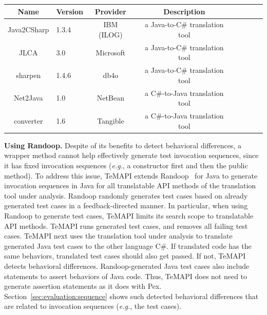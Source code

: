 
\label{sec:approach:sequence}
\begin{table}[t]
\centering
\begin{SmallOut}
\begin {tabular} {|c|l|c|c|c|c|c|c|}
\hline
\textbf{Name}& \textbf{Version}& \textbf{Provider} &\textbf{Description}\\
\hline
Java2CSharp  &  1.3.4 & IBM (ILOG) & a Java-to-C\# translation tool\\
\hline
JLCA         &  3.0   & Microsoft  & a Java-to-C\# translation tool\\
\hline
sharpen      &  1.4.6 & db4o       & a Java-to-C\# translation tool \\
\hline
Net2Java     &  1.0   & NetBean    & a C\#-to-Java translation tool\\
\hline
converter    &  1.6   & Tangible   & a C\#-to-Java translation tool\\
\hline
\end{tabular}%
 \label{table:subjects}
\end{SmallOut}\vspace*{-6ex}
\end{table}

\textbf{Using Randoop.} Despite of its benefits to detect behavioral differences, a wrapper method cannot help effectively generate test invocation sequences, since it has fixed invocation sequences (\emph{e.g.}, a constructor first and then the public method). To address this issue, TeMAPI extends Randoop~\cite{pacheco2007feedback} for Java to generate invocation sequences in Java for all translatable API methods of the translation tool under analysis. Randoop randomly generates test cases based on already generated test cases in a feedback-directed manner. In particular, when using Randoop to generate test cases, TeMAPI limits its search scope to translatable API methods. TeMAPI runs generated test cases, and removes all failing test cases. TeMAPI next uses the translation tool under analysis to translate generated Java test cases to the other language C\#. If translated code has the same behaviors, translated test cases should also get passed. If not, TeMAPI detects behavioral differences. Randoop-generated Java test cases also include  statements to assert behaviors of Java code. Thus, TeMAPI does not need to generate assertion statements as it does with Pex. Section~\ref{sec:evaluation:sequence} shows such detected behavioral differences that are related to invocation sequences (\emph{e.g.}, the  test cases).


